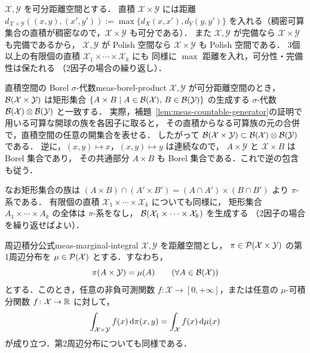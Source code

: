 $\mathcal{X},\mathcal{Y}$ を可分距離空間とする．
直積 $\mathcal{X}\times \mathcal{Y}$ には距離
$d_{\mathcal{X}\times \mathcal{Y}}((x,y),(x',y')):=\max\{d_X(x,x'),d_Y(y,y')\}$
を入れる（稠密可算集合の直積が稠密なので，$\mathcal{X}\times \mathcal{Y}$ も可分である）．
また $\mathcal{X},\mathcal{Y}$ が完備なら $\mathcal{X}\times \mathcal{Y}$ も完備であるから，
$\mathcal{X},\mathcal{Y}$ が Polish 空間なら $\mathcal{X}\times \mathcal{Y}$ も Polish 空間である．
3個以上の有限個の直積 $\mathcal{X}_1\times\cdots\times\mathcal{X}_k$ にも
同様に $\max$ 距離を入れ，可分性・完備性は保たれる
（2因子の場合の繰り返し）．

\begin{remark}{直積空間の Borel $\sigma$-代数}{meas-borel-product}
  $\mathcal{X},\mathcal{Y}$ が可分距離空間のとき，
  $\mathcal{B}(\mathcal{X}\times \mathcal{Y})$ は矩形集合
  $\{A\times B\mid A\in\mathcal{B}(\mathcal{X}),\,B\in\mathcal{B}(\mathcal{Y})\}$
  の生成する $\sigma$-代数
  $\mathcal{B}(\mathcal{X})\otimes\mathcal{B}(\mathcal{Y})$ と一致する．
  実際，補題~\ref{lem:meas-countable-generator}の証明で用いる可算な開球の族を各因子に取ると，
  その直積からなる可算族の元の合併で，直積空間の任意の開集合を表せる．
  したがって $\mathcal{B}(\mathcal{X}\times\mathcal{Y})\subset\mathcal{B}(\mathcal{X})\otimes\mathcal{B}(\mathcal{Y})$ である．
  逆に，$(x,y)\mapsto x$，$(x,y)\mapsto y$ は連続なので，
  $A\times\mathcal{Y}$ と $\mathcal{X}\times B$ は Borel 集合であり，
  その共通部分 $A\times B$ も Borel 集合である．これで逆の包含も従う．

  なお矩形集合の族は
  $(A\times B)\cap(A'\times B')=(A\cap A')\times(B\cap B')$
  より $\pi$-系である．
  有限個の直積 $\mathcal{X}_1\times\cdots\times\mathcal{X}_k$ についても同様に，
  矩形集合 $A_1\times\cdots\times A_k$ の全体は $\pi$-系をなし，
  $\mathcal{B}(\mathcal{X}_1\times\cdots\times\mathcal{X}_k)$ を生成する
  （2因子の場合を繰り返せばよい）．
\end{remark}

\begin{lemma}{周辺積分公式}{meas-marginal-integral}
  $\mathcal{X},\mathcal{Y}$ を距離空間とし，
  $\pi\in\mathcal{P}(\mathcal{X}\times\mathcal{Y})$ の第1周辺分布を
  $\mu\in\mathcal{P}(\mathcal{X})$ とする．すなわち，
  \[
    \pi(A\times\mathcal{Y})=\mu(A)
    \qquad(\forall A\in\mathcal{B}(\mathcal{X}))
  \]
  とする．このとき，任意の非負可測関数
  $f\colon\mathcal{X}\to[0,+\infty]$，または任意の $\mu$-可積分関数
  $f\colon\mathcal{X}\to\mathbb{R}$ に対して，
  \[
    \int_{\mathcal{X}\times \mathcal{Y}}f(x)\,\mathrm{d}\pi(x,y)
    =
    \int_{\mathcal{X}}f(x)\,\mathrm{d}\mu(x)
  \]
  が成り立つ．第2周辺分布についても同様である．
\end{lemma}

